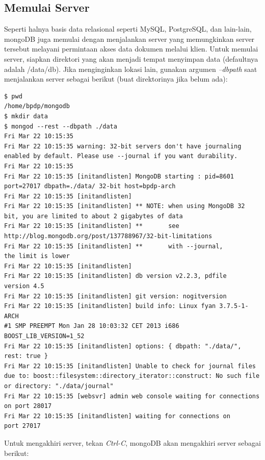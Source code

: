 \subsection{Memulai Server}
Seperti halnya basis data relasional seperti MySQL, PostgreSQL, dan lain-lain, mongoDB juga memulai dengan menjalankan server yang memungkinkan server tersebut melayani permintaan akses data dokumen melalui klien. Untuk memulai server, siapkan direktori yang akan menjadi tempat menyimpan data (defaultnya adalah /data/db). Jika menginginkan lokasi lain, gunakan argumen \textit{--dbpath} saat menjalankan server sebagai berikut (buat direktorinya jika belum ada):

\lstset{language=bash,caption=Menjalankan server MongoDB (mongod)}
\begin{lstlisting}
$ pwd
/home/bpdp/mongodb
$ mkdir data
$ mongod --rest --dbpath ./data
Fri Mar 22 10:15:35 
Fri Mar 22 10:15:35 warning: 32-bit servers don't have journaling 
enabled by default. Please use --journal if you want durability.
Fri Mar 22 10:15:35 
Fri Mar 22 10:15:35 [initandlisten] MongoDB starting : pid=8601 
port=27017 dbpath=./data/ 32-bit host=bpdp-arch
Fri Mar 22 10:15:35 [initandlisten] 
Fri Mar 22 10:15:35 [initandlisten] ** NOTE: when using MongoDB 32 
bit, you are limited to about 2 gigabytes of data
Fri Mar 22 10:15:35 [initandlisten] **       see 
http://blog.mongodb.org/post/137788967/32-bit-limitations
Fri Mar 22 10:15:35 [initandlisten] **       with --journal, 
the limit is lower
Fri Mar 22 10:15:35 [initandlisten] 
Fri Mar 22 10:15:35 [initandlisten] db version v2.2.3, pdfile 
version 4.5
Fri Mar 22 10:15:35 [initandlisten] git version: nogitversion
Fri Mar 22 10:15:35 [initandlisten] build info: Linux fyan 3.7.5-1-ARCH 
#1 SMP PREEMPT Mon Jan 28 10:03:32 CET 2013 i686 BOOST_LIB_VERSION=1_52
Fri Mar 22 10:15:35 [initandlisten] options: { dbpath: "./data/", 
rest: true }
Fri Mar 22 10:15:35 [initandlisten] Unable to check for journal files 
due to: boost::filesystem::directory_iterator::construct: No such file 
or directory: "./data/journal"
Fri Mar 22 10:15:35 [websvr] admin web console waiting for connections 
on port 28017
Fri Mar 22 10:15:35 [initandlisten] waiting for connections on 
port 27017

\end{lstlisting}

Untuk mengakhiri server, tekan \textit{Ctrl-C}, mongoDB akan mengakhiri server sebagai berikut:

